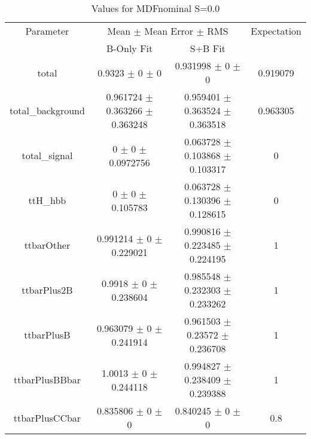 \begin{table}
\centering
\caption{Values for MDFnominal S=0.0}
\begin{tabular}{cccc}
\toprule
Parameter & \multicolumn{2}{c}{Mean $\pm$ Mean Error $\pm$ RMS} & Expectation\\
 & B-Only Fit & S+B Fit & \\
\midrule
total & \num{0.9323} $\pm$ \num{0} $\pm$ \num{0} & \num{0.931998} $\pm$ \num{0} $\pm$ \num{0} & \num{0.919079}\\
total\_background & \num{0.961724} $\pm$ \num{0.363266} $\pm$ \num{0.363248} & \num{0.959401} $\pm$ \num{0.363524} $\pm$ \num{0.363518} & \num{0.963305}\\
total\_signal & \num{0} $\pm$ \num{0} $\pm$ \num{0.0972756} & \num{0.063728} $\pm$ \num{0.103868} $\pm$ \num{0.103317} & \num{0}\\
ttH\_hbb & \num{0} $\pm$ \num{0} $\pm$ \num{0.105783} & \num{0.063728} $\pm$ \num{0.130396} $\pm$ \num{0.128615} & \num{0}\\
ttbarOther & \num{0.991214} $\pm$ \num{0} $\pm$ \num{0.229021} & \num{0.990816} $\pm$ \num{0.223485} $\pm$ \num{0.224195} & \num{1}\\
ttbarPlus2B & \num{0.9918} $\pm$ \num{0} $\pm$ \num{0.238604} & \num{0.985548} $\pm$ \num{0.232303} $\pm$ \num{0.233262} & \num{1}\\
ttbarPlusB & \num{0.963079} $\pm$ \num{0} $\pm$ \num{0.241914} & \num{0.961503} $\pm$ \num{0.23572} $\pm$ \num{0.236708} & \num{1}\\
ttbarPlusBBbar & \num{1.0013} $\pm$ \num{0} $\pm$ \num{0.244118} & \num{0.994827} $\pm$ \num{0.238409} $\pm$ \num{0.239388} & \num{1}\\
ttbarPlusCCbar & \num{0.835806} $\pm$ \num{0} $\pm$ \num{0} & \num{0.840245} $\pm$ \num{0} $\pm$ \num{0} & \num{0.8}\\
\bottomrule
\end{tabular}
\end{table}